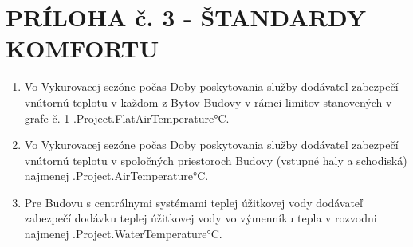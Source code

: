 \section{ PRÍLOHA č. 3 {-} ŠTANDARDY KOMFORTU}

\begin{enumerate}[label=\arabic*.]
\item Vo Vykurovacej sezóne počas Doby poskytovania služby dodávateľ zabezpečí vnútornú teplotu v každom z Bytov Budovy v rámci limitov stanovených v grafe č. 1  \iffalse input project.flat_airtemp value="{{.Project.FlatAirTemperature}}" \fi {{.Project.FlatAirTemperature}}°C.

	\item Vo Vykurovacej sezóne počas Doby poskytovania služby dodávateľ zabezpečí vnútornú teplotu v spoločných priestoroch Budovy (vstupné haly a schodiská) najmenej \iffalse input project.airtemp value="{{.Project.AirTemperature}}" \fi {{.Project.AirTemperature}}°C.

  \item Pre Budovu s centrálnymi systémami teplej úžitkovej vody dodávateľ zabezpečí dodávku teplej úžitkovej vody vo výmenníku tepla v rozvodni najmenej  \iffalse input project.watertemp value="{{.Project.WaterTemperature}}" \fi {{.Project.WaterTemperature}}°C.
\end{enumerate}
